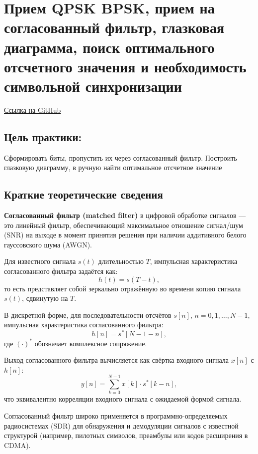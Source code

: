 \chapter[Прием QPSK BPSK, прием на согласованный фильтр, глазковая диаграмма, поиск оптимального отсчетного значения]{Прием QPSK BPSK, прием на согласованный фильтр, глазковая диаграмма, поиск оптимального отсчетного значения и необходимость символьной синхронизации}

\begin{leftbar}
    \href{https://github.com/someotb/sdr}{Ссылка на GitHub}
\end{leftbar}

\section*{Цель практики:}

Сформировать биты, пропустить их через согласованный фильтр. Построить глазковую диаграмму, в ручную найти оптимальное отсчетное значение
 
\section*{Краткие теоретические сведения}

\textbf{Согласованный фильтр (matched filter)} в цифровой обработке сигналов — это линейный фильтр, обеспечивающий максимальное отношение сигнал/шум (SNR) на выходе в момент принятия решения при наличии аддитивного белого гауссовского шума (AWGN).  

Для известного сигнала \( s(t) \) длительностью \( T \), импульсная характеристика согласованного фильтра задаётся как:
$$
h(t) = s(T - t),
$$
то есть представляет собой зеркально отражённую во времени копию сигнала \( s(t) \), сдвинутую на \( T \).

В дискретной форме, для последовательности отсчётов \( s[n] \), \( n = 0, 1, \dots, N-1 \), импульсная характеристика согласованного фильтра:
$$
h[n] = s^*[N - 1 - n],
$$
где \( (\cdot)^* \) обозначает комплексное сопряжение.

Выход согласованного фильтра вычисляется как свёртка входного сигнала \( x[n] \) с \( h[n] \):
$$
y[n] = \sum_{k=0}^{N-1} x[k] \cdot s^*[k - n],
$$
что эквивалентно корреляции входного сигнала с ожидаемой формой сигнала.  

Согласованный фильтр широко применяется в программно-определяемых радиосистемах (SDR) для обнаружения и демодуляции сигналов с известной структурой (например, пилотных символов, преамбулы или кодов расширения в CDMA).

